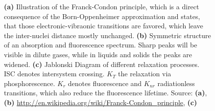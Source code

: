 \documentclass{scrartcl}
\numberwithin{equation}{section}
\numberwithin{figure}{section}
\numberwithin{table}{section}
\begin{document}
\begin{figure}
\centering
{}
\hfill
{}

\caption{ \small \textbf{(a)} Illustration of the Franck-Condon principle, which is a direct consequence of the Born-Oppenheimer approximation and states, that those electronic-vibraonic transitions are favored, which leave the inter-nuclei distance mostly unchanged. 
\textbf{(b)} Symmetric structure of an absorption and fluorescence spectrum. Sharp peaks will be visible in dilute gases, while in liquids and solids the peaks are widened. 
\textbf{(c)} Jablonski Diagram of different relaxation processes. ISC denotes intersystem crossing. $K_T$ the relaxation via phosphorescence. $K_r$ denotes fluorescence and $K_{nr}$ radiationless transitions, which also reduce the fluorescence lifetime. \footnotesize Source: \textbf{(a)}, \textbf{(b)} \url{http://en.wikipedia.org/wiki/Franck-Condon_principle}, \textbf{(c)} \cite{omg}}
\label{condon}
\end{figure}
\end{document}
